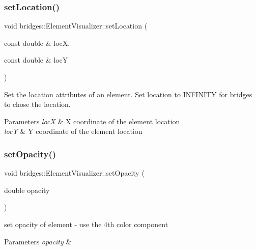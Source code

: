 \subsubsection{\texorpdfstring{set\+Location()}{setLocation()}}
{\footnotesize\ttfamily void bridges\+::\+Element\+Visualizer\+::set\+Location (\begin{DoxyParamCaption}\item[{const double \&}]{locX,  }\item[{const double \&}]{locY }\end{DoxyParamCaption})\hspace{0.3cm}{\ttfamily [inline]}}

Set the location attributes of an element. Set location to I\+N\+F\+I\+N\+I\+TY for bridges to chose the location.


\begin{DoxyParams}{Parameters}
{\em locX} & X coordinate of the element location \\
\hline
{\em locY} & Y coordinate of the element location \\
\hline
\end{DoxyParams}
\mbox{\label{classbridges_1_1_element_visualizer_a8f77db4a2774021aec4ab8ea18e50fc9}} 
\subsubsection{\texorpdfstring{set\+Opacity()}{setOpacity()}}
{\footnotesize\ttfamily void bridges\+::\+Element\+Visualizer\+::set\+Opacity (\begin{DoxyParamCaption}\item[{double}]{opacity }\end{DoxyParamCaption})\hspace{0.3cm}{\ttfamily [inline]}}

set opacity of element -\/ use the 4th color component


\begin{DoxyParams}{Parameters}
{\em opacity} & \\
\hline
\end{DoxyParams}
\mbox{\label{classbridges_1_1_element_visualizer_af81cc20423f2fedffa81fb7c473a1179}} 
